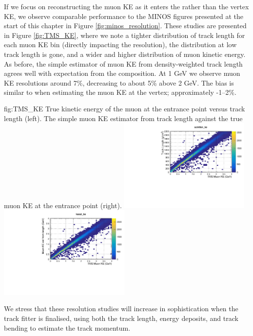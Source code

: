 If we focus on reconstructing the muon KE as it enters the  rather than the  vertex KE, we observe comparable performance to the MINOS figures presented at the start of this chapter in Figure \ref{fig:minos_resolution}. These studies are presented in Figure \ref{fig:TMS_KE}, where we note a tighter distribution of track length for each muon KE bin (directly impacting the resolution), the distribution at low track length is gone, and a wider and higher distribution of muon kinetic energy. As before, the simple estimator of muon KE from density-weighted track length agrees well with expectation from the  composition. At 1 GeV we observe muon KE resolutions around 7\%, decreasing to about 5\% above 2 GeV. The bias is similar to when estimating the muon KE at the  vertex; approximately -1--2\%.
\begin{dunefigure}{fig:TMS_KE}
{True kinetic energy of the muon at the  entrance point versus track length (left). The simple muon KE estimator from track length against the true muon KE at the  entrance point (right).}
\includegraphics[width=0.49\textwidth, clip, trim={0mm 0mm 0mm 10mm}]{graphics/tms/Simulation/KE_est/TMSKE_tracklength.pdf}
\includegraphics[width=0.49\textwidth, clip, trim={0mm 0mm 0mm 10mm}]{graphics/tms/Simulation/KE_est/TMSKE_est.pdf}
\end{dunefigure}

We stress that these resolution studies will increase in sophistication when the track fitter is finalised, using both the track length, energy deposits, and track bending to estimate the track momentum.

